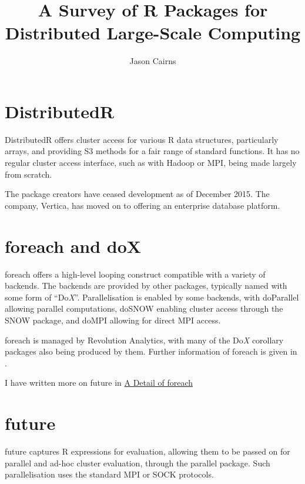 \documentclass[10pt,a4paper]{article}
\begin{document}
\title{A Survey of R Packages for Distributed Large-Scale Computing}
\author{Jason Cairns}
  
\maketitle{}

\tableofcontents{}

\section{DistributedR}
\label{sec:distributedr}
DistributedR offers cluster access for various R data structures,
particularly arrays, and providing S3 methods for a fair range of
standard functions. It has no regular cluster access interface, such
as with Hadoop or MPI, being made largely from scratch.

The package creators have ceased development as of December 2015. The
company, Vertica, has moved on to offering an enterprise database
platform\cite{vertica:_distr}.

\section{foreach and doX}
\label{sec:foreach-dox}

foreach offers a high-level looping construct compatible with a
variety of backends\cite{microsoft20}. The backends are provided by
other packages, typically named with some form of ``Do\textit{X}''.
Parallelisation is enabled by some backends, with doParallel allowing
parallel computations\cite{corporation19}, doSNOW enabling cluster
access through the SNOW package\cite{dosnow19}, and doMPI allowing for
direct MPI access\cite{weston17}.

foreach is managed by Revolution Analytics, with many of the
Do\textit{X} corollary packages also being produced by them. Further
information of foreach is given in \textcite{weston19:_using}.

I have written more on future in \href{review-foreach.pdf}{A Detail of foreach}

\section{future}
\label{sec:future-furrr}

future captures R expressions for evaluation, allowing them to be
passed on for parallel and ad-hoc cluster evaluation, through the
parallel package\cite{bengtsson20}. Such parallelisation uses the
standard MPI or SOCK protocols.
\end{document}
